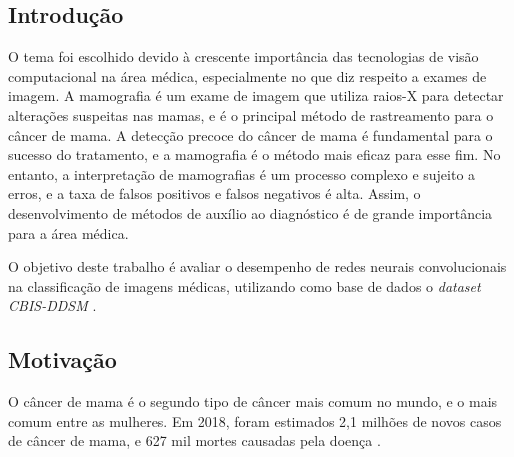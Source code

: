 %
\begin{introducao}
    \chapter{Introdução}
    \label{chap:introducao}


O tema foi escolhido devido à crescente importância das tecnologias de visão computacional na área médica,
especialmente no que diz respeito a exames de imagem. A mamografia é um exame de imagem
que utiliza raios-X para detectar alterações suspeitas nas mamas, e é o principal método de rastreamento
para o câncer de mama. A detecção precoce do câncer de mama é fundamental para o sucesso do tratamento, e a 
mamografia é o método mais eficaz para esse fim. No entanto, a interpretação de mamografias é um processo 
complexo e sujeito a erros, e a taxa de falsos positivos e falsos negativos é alta.
Assim, o desenvolvimento de métodos de auxílio ao diagnóstico é de grande importância para a área médica.

O objetivo deste trabalho é avaliar o desempenho de redes neurais convolucionais na classificação de imagens
médicas, utilizando como base de dados o \textit{dataset} \textit{CBIS-DDSM} \cite{cbis-ddsm}.

\section{Motivação}
\label{sec:motivacao}

O câncer de mama é o segundo tipo de câncer mais comum no mundo, e o mais comum entre as mulheres.
Em 2018, foram estimados 2,1 milhões de novos casos de câncer de mama, e 627 mil mortes causadas pela doença \cite{cancer-stats}.

\end{introducao}


